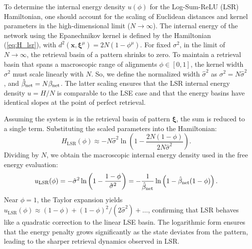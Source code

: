 \documentclass{article}
\theoremstyle{plain}
\theoremstyle{definition}
\theoremstyle{remark}
\begin{document}
To determine the internal energy density $u(\phi)$ for the Log-Sum-ReLU (LSR) Hamiltonian, one should account for the scaling of Euclidean distances and kernel parameters in the high-dimensional limit ($N \to \infty$). The internal energy of the network using the Epanechnikov kernel is defined by the Hamiltonian (\ref{eq:H_lsr}), with $d^2(\mathbf{x}, \boldsymbol{\xi}^\mu) = 2N(1 - \phi^\mu)$. 
For fixed $\sigma^2$, in the limit of $N \to \infty$, the retrieval basin of a pattern shrinks to zero. To maintain a retrieval basin that spans a macroscopic range of alignments $\phi \in [0, 1]$, the kernel width $\sigma^2$ must scale linearly with $N$. So, we define the normalized width $\hat{\sigma}^2$ as $\sigma^2 = N \hat{\sigma}^2$, and $\hat\beta_{\rm net} = N \beta_{\rm net}$. The latter scaling ensures  that the LSR internal energy density $u = H/N$ is comparable to the LSE case and that the energy basins have identical slopes at the point of perfect retrieval.

Assuming the system is in the retrieval basin of pattern $\bm{\xi}$, the sum is reduced to a single term. Substituting the scaled parameters into the Hamiltonian:
\begin{equation}
H_{\text{LSR}}(\phi) \approx -N \hat{\sigma}^2 \ln \left( 1 - \frac{2N(1-\phi)}{2N\hat{\sigma}^2} \right).
\end{equation}
Dividing by $N$, we obtain the macroscopic internal energy density used in the free energy evaluation:
\begin{equation}
u_{\text{LSR}}(\phi) = -\hat{\sigma}^2 \ln \left( 1 - \frac{1-\phi}{\hat{\sigma}^2} \right) = -\frac{1}{\hat\beta_{\rm net}} \ln \left( 1 - \hat\beta_{\rm net}(1-\phi) \right).
\end{equation}
Near $\phi=1$, the Taylor expansion yields $u_{\text{LSR}}(\phi) \approx (1-\phi) + (1-\phi)^2 /(2\hat{\sigma}^2) + \dots$, confirming that LSR behaves like a quadratic correction to the linear LSE basin. The logarithmic form ensures that the energy penalty grows significantly as the state deviates from the pattern, leading to the sharper retrieval dynamics observed in LSR.

\end{document}

